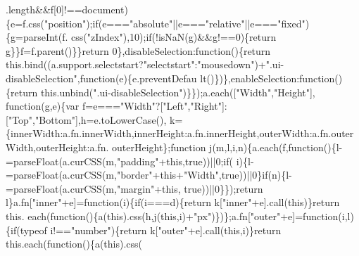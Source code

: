 \begin{DoxyCode}
      .length&&f[0]!==document)\{e=f.css(\textcolor{stringliteral}{"position"});\textcolor{keywordflow}{if}(e===\textcolor{stringliteral}{"absolute"}||e===\textcolor{stringliteral}{"relative"}||e===\textcolor{stringliteral}{"fixed"})\{g=parseInt(f.
      css(\textcolor{stringliteral}{"zIndex"}),10);\textcolor{keywordflow}{if}(!isNaN(g)&&g!==0)\{\textcolor{keywordflow}{return} g\}\}f=f.parent()\}\}\textcolor{keywordflow}{return} 0\},disableSelection:\textcolor{keyword}{function}()\{\textcolor{keywordflow}{return} 
      this.bind((a.support.selectstart?\textcolor{stringliteral}{"selectstart"}:\textcolor{stringliteral}{"mousedown"})+\textcolor{stringliteral}{".ui-disableSelection"},\textcolor{keyword}{function}(e)\{e.preventDefau
      lt()\})\},enableSelection:\textcolor{keyword}{function}()\{\textcolor{keywordflow}{return} this.unbind(\textcolor{stringliteral}{".ui-disableSelection"})\}\});a.each([\textcolor{stringliteral}{"Width"},\textcolor{stringliteral}{"Height"}],\textcolor{keyword}{
      function}(g,e)\{var f=e===\textcolor{stringliteral}{"Width"}?[\textcolor{stringliteral}{"Left"},\textcolor{stringliteral}{"Right"}]:[\textcolor{stringliteral}{"Top"},\textcolor{stringliteral}{"Bottom"}],h=e.toLowerCase(),
      k=\{innerWidth:a.fn.innerWidth,innerHeight:a.fn.innerHeight,outerWidth:a.fn.outerWidth,outerHeight:a.fn.
      outerHeight\};\textcolor{keyword}{function} j(m,l,i,n)\{a.each(f,\textcolor{keyword}{function}()\{l-=parseFloat(a.curCSS(m,\textcolor{stringliteral}{"padding"}+\textcolor{keyword}{this},\textcolor{keyword}{true}))||0;\textcolor{keywordflow}{if}(
      i)\{l-=parseFloat(a.curCSS(m,\textcolor{stringliteral}{"border"}+\textcolor{keyword}{this}+\textcolor{stringliteral}{"Width"},\textcolor{keyword}{true}))||0\}\textcolor{keywordflow}{if}(n)\{l-=parseFloat(a.curCSS(m,\textcolor{stringliteral}{"margin"}+\textcolor{keyword}{this},\textcolor{keyword}{
      true}))||0\}\});\textcolor{keywordflow}{return} l\}a.fn[\textcolor{stringliteral}{"inner"}+e]=\textcolor{keyword}{function}(i)\{\textcolor{keywordflow}{if}(i===d)\{\textcolor{keywordflow}{return} k[\textcolor{stringliteral}{"inner"}+e].call(\textcolor{keyword}{this})\}\textcolor{keywordflow}{return} this.
      each(\textcolor{keyword}{function}()\{a(\textcolor{keyword}{this}).css(h,j(\textcolor{keyword}{this},i)+\textcolor{stringliteral}{"px"})\})\};a.fn[\textcolor{stringliteral}{"outer"}+e]=\textcolor{keyword}{function}(i,l)\{\textcolor{keywordflow}{if}(typeof 
      i!==\textcolor{stringliteral}{"number"})\{\textcolor{keywordflow}{return} k[\textcolor{stringliteral}{"outer"}+e].call(\textcolor{keyword}{this},i)\}\textcolor{keywordflow}{return} this.each(\textcolor{keyword}{function}()\{a(\textcolor{keyword}{this}).css(

\end{DoxyCode}
